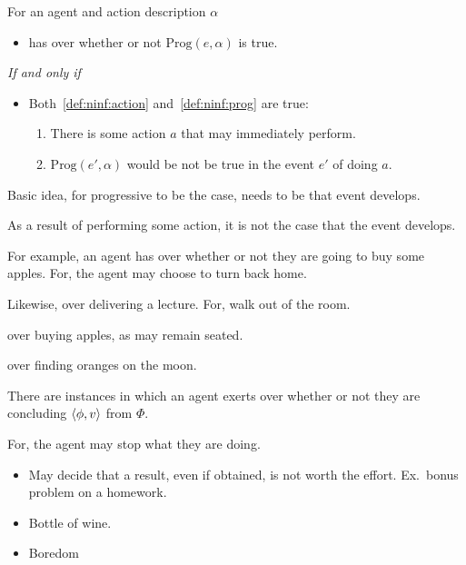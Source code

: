 \begin{note}
  \begin{definition}[\ninf{2}]
    \label{def:ninf}
    For an agent \vAgent{} and action description \(\alpha\)

    \begin{itemize}
    \item
      \vAgent{} has \ninf{} over whether or not \(\text{Prog}(e, \alpha)\) is true.
    \end{itemize}

    \emph{If and only if}

    \begin{itemize}
    \item
      Both~\ref{def:ninf:action} and~\ref{def:ninf:prog} are true:
      \begin{enumerate}[label=\alph*., ref=(\alph*)]
      \item
        \label{def:ninf:action}
        There is some action \(a\) that \vAgent{} may immediately perform.
      \item
        \label{def:ninf:prog}
        \(\text{Prog}(e', \alpha)\) would be not be true in the event \(e'\) of \vAgent{} doing \(a\).
      \end{enumerate}
    \end{itemize}
    \vspace{-\baselineskip}
  \end{definition}

  Basic idea, for progressive to be the case, needs to be that event develops.

  As a result of performing some action, it is not the case that the event develops.
\end{note}

\begin{note}
  For example, an agent has  over whether or not they are going to buy some apples.
  For, the agent may choose to turn back home.

  Likewise, \ninf{} over delivering a lecture.
  For, walk out of the room.

  \ninf{} over buying apples, as may remain seated.

  \ninf{} over finding oranges on the moon.
\end{note}

\begin{note}
  \begin{observation}
    \label{ob:ninf}
    There are instances in which an agent exerts  over whether or not they are concluding \(\langle \phi, v \rangle\) from \(\Phi\).
  \end{observation}

  For, the agent may stop what they are doing.

  \begin{itemize}
  \item
    May decide that a result, even if obtained, is not worth the effort. Ex.\ bonus problem on a homework.
  \item
    Bottle of wine.
  \item
    Boredom
  \end{itemize}
\end{note}

